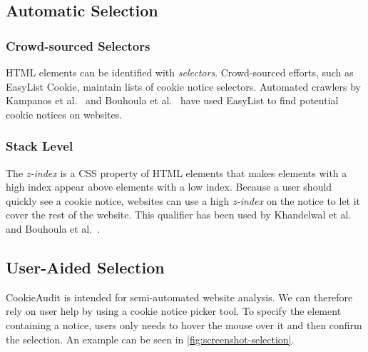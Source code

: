 \subsection{Automatic Selection}
\subsubsection{Crowd-sourced Selectors}
HTML elements can be identified with \emph{selectors}. 
Crowd-sourced efforts, such as EasyList Cookie, maintain lists of cookie notice selectors.
Automated crawlers by Kampanos et al.~\cite{kampanos2021accept} and Bouhoula et al.~\cite{bouhoula2023automated} have used EasyList to find potential cookie notices on websites.

\subsubsection{Stack Level}
The \emph{z-index} is a CSS property of HTML elements that makes elements with a high index appear above elements with a low index. 
Because a user should quickly see a cookie notice, websites can use a high \emph{z-index} on the notice to let it cover the rest of the website. 
This qualifier has been used by Khandelwal et al.~\cite{khandelwal2023automated} and Bouhoula et al.~\cite{bouhoula2023automated}.

\subsection{User-Aided Selection} \label{subsec:user-aided-selection}
CookieAudit is intended for semi-automated website analysis.
We can therefore rely on user help by using a cookie notice picker tool.
To specify the element containing a notice, users only needs to hover the mouse over it and then confirm the selection. 
An example can be seen in \cref{fig:screenshot-selection}.

